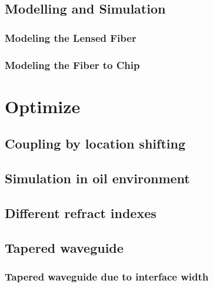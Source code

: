 \section{Modelling and Simulation}

\subsection{Modeling the Lensed Fiber}
\label{sect:model_model_model_TLF}

\subsection{Modeling the Fiber to Chip}
\label{sect:model_model_fiber2chip}


%
\chapter{Optimize}
\label{chp:optim}


\section{Coupling by location shifting}
\label{sect:optim_shift}


\section{Simulation in oil environment}


\section{Different refract indexes}


\section{Tapered waveguide}


\subsection{Tapered waveguide due to interface width} 


